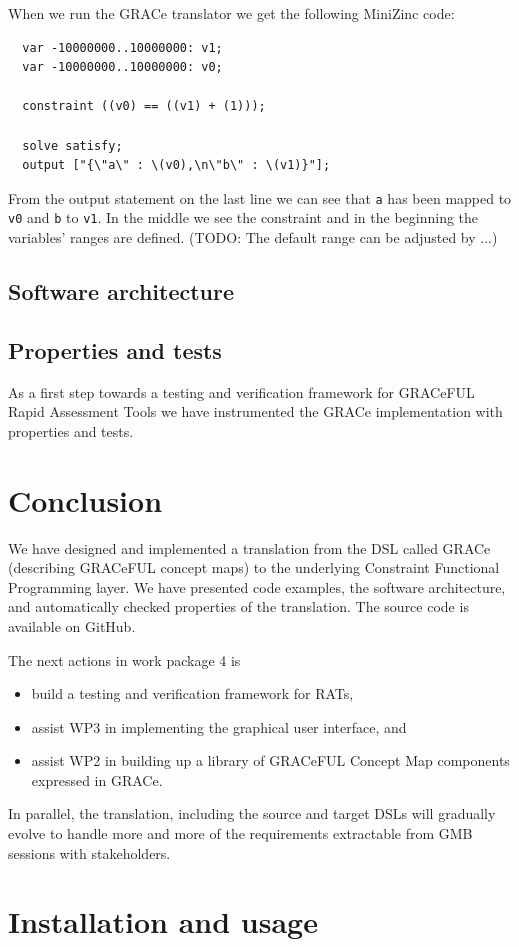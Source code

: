 \documentclass{article}
\begin{document}
When we run the GRACe translator we get the following MiniZinc code:
%
\begin{verbatim}
  var -10000000..10000000: v1;
  var -10000000..10000000: v0;

  constraint ((v0) == ((v1) + (1)));

  solve satisfy;
  output ["{\"a\" : \(v0),\n\"b\" : \(v1)}"];
\end{verbatim}
%
From the output statement on the last line we can see that \texttt{a} has
been mapped to \texttt{v0} and \texttt{b} to \texttt{v1}.
%
In the middle we see the constraint and in the beginning the
variables' ranges are defined.
%
(TODO: The default range can be adjusted by ...)



\subsection{Software architecture}



\subsection{Properties and tests}

As a first step towards a testing and verification framework for
GRACeFUL Rapid Assessment Tools we have instrumented the GRACe
implementation with properties and tests.
%


\section{Conclusion}

We have designed and implemented a translation from the DSL called
GRACe (describing GRACeFUL concept maps) to the underlying Constraint
Functional Programming layer.
%
We have presented code examples, the software architecture, and
automatically checked properties of the translation.
%
The source code is available on GitHub.

The next actions in work package 4 is
\begin{itemize}
\item build a testing and verification framework for RATs,
\item assist WP3 in implementing the graphical user interface, and
\item assist WP2 in building up a library of GRACeFUL Concept Map
  components expressed in GRACe.
\end{itemize}
%
In parallel, the translation, including the source and target DSLs
will gradually evolve to handle more and more of the requirements
extractable from GMB sessions with stakeholders.


\appendix
\section{Installation and usage}





\end{document}
